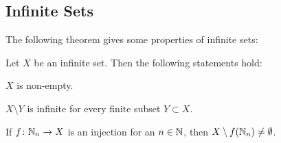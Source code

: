 \subsection{Infinite Sets}
 
The following theorem gives some properties of infinite sets:

\begin{theorem}\label{lemma:finite_infinite:properties_of_infinite_sets}
    Let $X$ be an infinite set. Then the following statements hold:
    \begin{intheoremenumerate}
        \item\label{theorem:finite_infinite:infinite_nonempty} $X$ is non-empty.
        \item\label{theorem:finite_infinite:infinite_setminus} $X\setminus Y$ is infinite for every finite subset $Y\subset X$.
        \item\label{theorem:finite_infinite:image_nonempty} If $f\colon\mathbb{N}_n\to X$ is an injection for an $n\in\mathbb{N}$, then $X\setminus f(\mathbb{N}_n)\neq\emptyset$.
    \end{intheoremenumerate}
\end{theorem}
